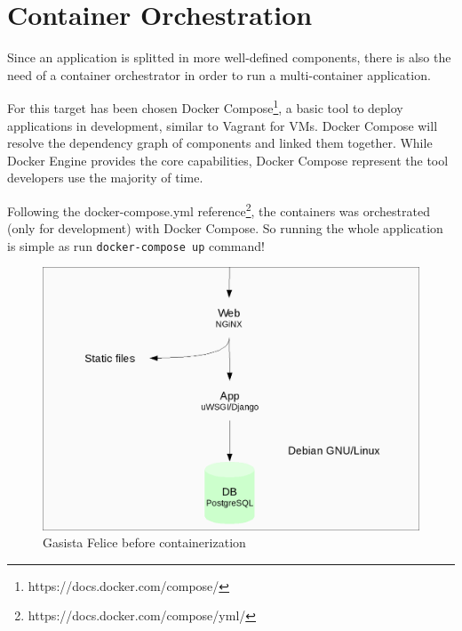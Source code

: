 \section{Container Orchestration}\label{container-orchestration}

Since an application is splitted in more well-defined components, there is also the need of a container orchestrator in order to run a multi-container application.

For this target has been chosen Docker Compose\footnote{https://docs.docker.com/compose/}, a basic tool to deploy applications in development, similar to Vagrant for VMs. Docker Compose will resolve the dependency graph of components and linked them together. While Docker Engine provides the core capabilities, Docker Compose represent the tool developers use the majority of time.

Following the docker-compose.yml reference\footnote{https://docs.docker.com/compose/yml/}, the containers was orchestrated (only for development) with Docker Compose. So running the whole application is simple as run \texttt{docker-compose up} command!

\begin{figure}[htbp]
\centering
\includegraphics{media/ch3-gf_old.png}
\caption{Gasista Felice before containerization}
\end{figure}

